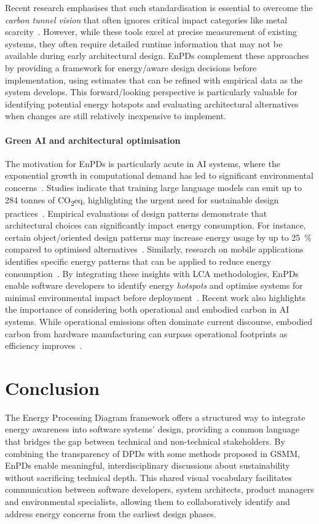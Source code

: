 Recent research emphasises that such standardisation is essential to overcome the \emph{carbon tunnel vision} that often ignores critical impact categories like metal scarcity~\cite{ligozat2022unraveling}.
However, while these tools excel at precise measurement of existing systems, they often require detailed runtime information that may not be available during early architectural design.
EnPDs complement these approaches by providing a framework for energy\-/aware design decisions before implementation, using estimates that can be refined with empirical data as the system develops.
This forward\-/looking perspective is particularly valuable for identifying potential energy hotspots and evaluating architectural alternatives when changes are still relatively inexpensive to implement.

\paragraph{Green AI and architectural optimisation}
The motivation for EnPDs is particularly acute in AI systems, where the exponential growth in computational demand has led to significant environmental concerns~\cite{schwartz2020green}.
Studies indicate that training large language models can emit up to \num{284} tonnes of CO\textsubscript{2}eq, highlighting the urgent need for sustainable design practices~\cite{strubell2019energy}.
Empirical evaluations of design patterns demonstrate that architectural choices can significantly impact energy consumption.
For instance, certain object\-/oriented design patterns may increase energy usage by up to \qty{25}{\percent} compared to optimised alternatives~\cite{feitosa2017investigating}.
Similarly, research on mobile applications identifies specific energy patterns that can be applied to reduce energy consumption~\cite{cruz2019catalog}.
By integrating these insights with LCA methodologies, EnPDs enable software developers to identify energy \emph{hotspots} and optimise systems for minimal environmental impact before deployment~\cite{ligozat2022unraveling}.
Recent work also highlights the importance of considering both operational and embodied carbon in AI systems.
While operational emissions often dominate current discourse, embodied carbon from hardware manufacturing can surpass operational footprints as efficiency improves~\cite{wu2022sustainable}.

\section{Conclusion}
The Energy Processing Diagram framework offers a structured way to integrate energy awareness into software systems' design, providing a common language that bridges the gap between technical and non-technical stakeholders.
By combining the transparency of DPDs with some methods proposed in GSMM, EnPDs enable meaningful, interdisciplinary discussions about sustainability without sacrificing technical depth.
This shared visual vocabulary facilitates communication between software developers, system architects, product managers and environmental specialists, allowing them to collaboratively identify and address energy concerns from the earliest design phases.

